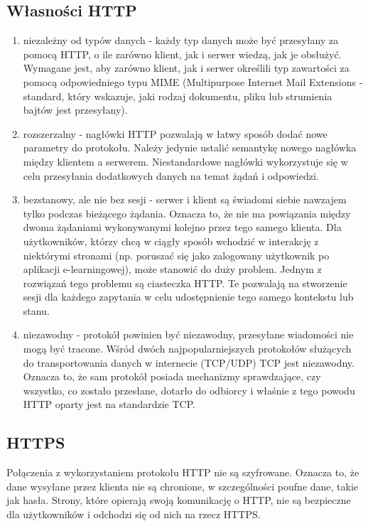 	\subsection{Własności HTTP}
		\begin{enumerate}
			\item niezależny od typów danych - każdy typ danych może być przesyłany za pomocą HTTP, o ile zarówno klient, jak i serwer wiedzą, jak je obsłużyć. Wymagane jest, aby zarówno klient, jak i serwer określili typ zawartości za pomocą odpowiedniego typu MIME (Multipurpose Internet Mail Extensions - standard, który wskazuje, jaki rodzaj dokumentu, pliku lub strumienia bajtów jest przesyłany).
			
			\item rozszerzalny - nagłówki HTTP pozwalają w łatwy sposób dodać nowe parametry do protokołu. Należy jedynie ustalić semantykę nowego nagłówka między klientem a serwerem. Niestandardowe nagłówki wykorzystuje się w celu przesyłania dodatkowych danych na temat żądań i odpowiedzi.
			
			\item bezstanowy, ale nie bez sesji - serwer i klient są świadomi siebie nawzajem tylko podczas bieżącego żądania. Oznacza to, że nie ma powiązania między dwoma żądaniami wykonywanymi kolejno przez tego samego klienta. Dla użytkowników, którzy chcą w ciągły sposób wchodzić w interakcję z niektórymi stronami (np. poruszać się jako zalogowany użytkownik po aplikacji e-learningowej), może stanowić do duży problem. Jednym z rozwiązań tego problemu są ciasteczka HTTP. Te pozwalają na stworzenie sesji dla każdego zapytania w celu udostępnienie tego samego kontekstu lub stanu.
			
			\item niezawodny - protokół powinien być niezawodny, przesyłane wiadomości nie mogą być tracone. Wśród dwóch najpopularniejszych protokołów służących do transportowania danych w internecie (TCP/UDP) TCP jest niezawodny. Oznacza to, że sam protokół posiada mechanizmy sprawdzające, czy wszystko, co zostało przesłane, dotarło do odbiorcy i właśnie z tego powodu HTTP oparty jest na standardzie TCP.
		\end{enumerate}
	
	\subsection{HTTPS}
		Połączenia z wykorzystaniem protokołu HTTP nie są szyfrowane. Oznacza to, że dane wysyłane przez klienta nie są chronione, w szczególności poufne dane, takie jak hasła. Strony, które opierają swoją komunikację o HTTP, nie są bezpieczne dla użytkowników i odchodzi się od nich na rzecz HTTPS.
		
